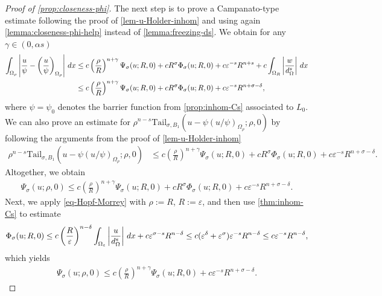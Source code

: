 \documentclass[11pt,reqno]{amsart}
\theoremstyle{plain}
\theoremstyle{definition}
\numberwithin{equation}{section}
\newcommand{\eps}{\varepsilon}
\newcommand{\1}{\mathbbm{1}}
\renewcommand{\d}{\textnormal{\,d}}
\begin{document}
\begin{proof}[Proof of \autoref{prop:closeness-phi}]
The next step is to prove a Campanato-type estimate following the proof of \autoref{lem-u-Holder-inhom} and using again \autoref{lemma:closeness-phi-help} instead of \autoref{lemma:freezing-ds}. We obtain for any $\gamma \in (0,\alpha s)$
\begin{align*}
    \int_{\Omega_{\rho}} \left|\frac{u}{\psi} - \left( \frac{u}{\psi} \right)_{\Omega_{\rho}} \right| \d x 
    &\le c \left( \frac{\rho}{R} \right)^{n+ \gamma} \Psi_{\sigma}(u; R, 0) + cR^{\sigma}\Phi_{\sigma}(u; R, 0) + c \eps^{-s} R^{n + s} + c \int_{\Omega_R} \left| \frac{w}{d_{\Omega}^s} \right| \d x \\
    &\le  c \left( \frac{\rho}{R} \right)^{n+ \gamma} \Psi_{\sigma}(u;R,0) + cR^{\sigma}\Phi_{\sigma}(u; R, 0) + c \eps^{-s} R^{n + \sigma - \delta},
\end{align*}
where $\psi = \psi_0$ denotes the barrier function from \autoref{prop:inhom-Cs} associated to $L_0$. We can also prove an estimate for $\rho^{n-s} \mathrm{Tail}_{\sigma,B_1}(u - \psi (u/\psi)_{\Omega_{\rho}}; \rho, 0)$ by following the arguments from the proof of \autoref{lem-u-Holder-inhom}
\begin{align*}
   \rho^{n-s} \mathrm{Tail}_{\sigma,B_1}(u - \psi (u/\psi)_{\Omega_{\rho}}; \rho, 0) &\le c \left( \frac{\rho}{R} \right)^{n+\gamma} \Psi_{\sigma}(u;R,0) + cR^{\sigma}\Phi_{\sigma}(u; R, 0) + c \eps^{-s} R^{n + \sigma - \delta}.
    \end{align*}
Altogether, we obtain
\begin{align*}
    \Psi_{\sigma}(u;\rho,0) \le c \left( \frac{\rho}{R} \right)^{n+\gamma} \Psi_{\sigma}(u;R,0) + cR^{\sigma}\Phi_{\sigma}(u; R, 0) + c \eps^{-s} R^{n + \sigma - \delta}.
\end{align*}
Next, we apply \eqref{eq-Hopf-Morrey} with $\rho:=R$, $R:=\varepsilon$, and then use  \autoref{thm:inhom-Cs} to estimate
\begin{align*}
    \Phi_{\sigma}(u; R, 0) \leq c \left( \frac{R}{\varepsilon} \right)^{n-\delta} \int_{\Omega_\varepsilon} \left| \frac{u}{d_{\Omega}^s} \right| \d x + c \eps^{\sigma-s} R^{n - \delta} \leq c(\varepsilon^{\delta}+\varepsilon^{\sigma}) \eps^{-s} R^{n-\delta} \leq c \eps^{-s} R^{n-\delta},
\end{align*}
which yields
\begin{align*}
    \Psi_{\sigma}(u;\rho,0) \le c \left( \frac{\rho}{R} \right)^{n+\gamma} \Psi_{\sigma}(u;R,0) + c \eps^{-s} R^{n + \sigma - \delta}.
\end{align*}


\end{proof}
\end{document}
